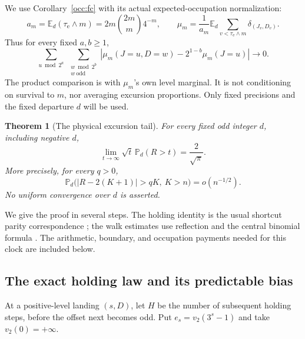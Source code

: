 \documentclass[11pt]{amsart}
\newtheorem{theorem}{Theorem}[section]
\theoremstyle{definition}
\theoremstyle{remark}
\newcommand{\E}{\mathbb E}
\newcommand{\PP}{\mathbb P}
\begin{document}
We use Corollary~\ref{occ:fc} with its actual expected-occupation
normalization:
\begin{equation}\label{clk:occupation}
 a_m=\E_d(\tau_{\mathrm e}\wedge m)=2m\binom{2m}{m}4^{-m},\qquad
 \mu_m=\frac1{a_m}\E_d\sum_{v<\tau_{\mathrm e}\wedge m}\delta_{(J_v,D_v)}.
\end{equation}
Thus for every fixed $a,b\ge1$,
\begin{equation}\label{clk:fc}
 \sum_{u\bmod2^a}\ \sum_{\substack{w\bmod2^b\\w\ \text{odd}}}
 \left|\mu_m(J=u,D=w)-2^{1-b}\mu_m(J=u)\right|\longrightarrow0.
\end{equation}
The product comparison is with $\mu_m$'s own level marginal. It is not
conditioning on survival to $m$, nor averaging excursion proportions.
Only fixed precisions and the fixed departure $d$ will be used.

\begin{theorem}[The physical excursion tail]\label{clk:excursion-tail}\label{clock:tail}
For every fixed odd integer $d$, including negative $d$,
\begin{equation}\label{clk:tail-limit}
 \lim_{t\to\infty}\sqrt t\,\PP_d(R>t)=\frac2{\sqrt\pi}.
\end{equation}
More precisely, for every $q>0$,
\begin{equation}\label{clk:relative-error}
 \PP_d\bigl(|R-2(K+1)|>qK,\ K>n\bigr)=o(n^{-1/2}).
\end{equation}
No uniform convergence over $d$ is asserted.
\end{theorem}

We give the proof in several steps. The holding identity is the usual
shortcut parity correspondence \cite{Terras1976,Lagarias1985}; the walk estimates
use reflection and the central binomial formula \cite{Feller}. The
arithmetic, boundary, and occupation payments needed for this clock are
included below.

\subsection{The exact holding law and its predictable bias}

At a positive-level landing $(s,D)$, let $H$ be the number of subsequent
holding steps, before the offset next becomes odd. Put
$e_s=v_2(3^s-1)$ and take $v_2(0)=+\infty$.
\end{document}
